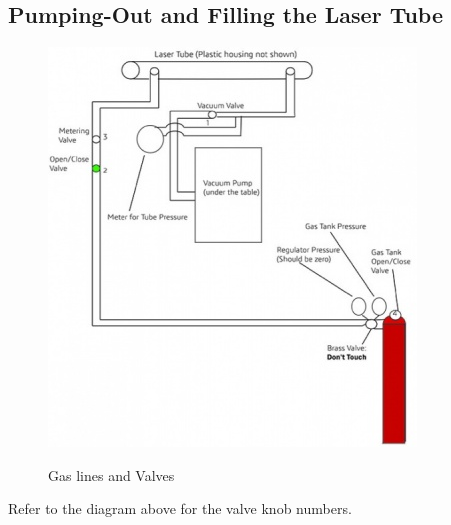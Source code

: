 \documentclass{../lab}
\begin{document}
\subsection{Pumping-Out and Filling the Laser Tube}

\begin{figure}[h]
    \centering
    \href{http://experimentationlab.berkeley.edu/sites/default/files/upimages/lasergaspic_small.jpg}{\includegraphics[width=0.5\linewidth]{images/lasergaspic_small.jpg}}
    \caption{Gas lines and Valves}
    \label{fig:GasLinesAndValves}
\end{figure}
 
Refer to the diagram above for the valve knob numbers.
\end{document}
